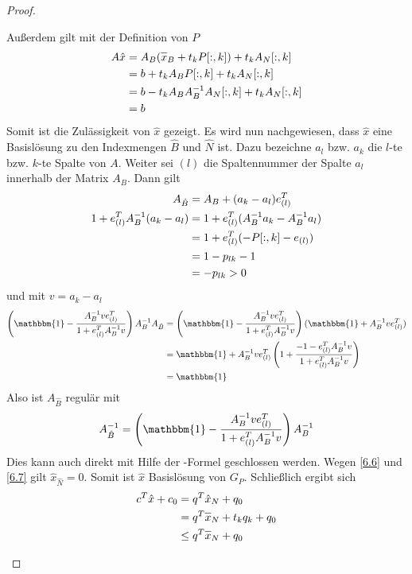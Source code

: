 \begin{proof}
\begin{enumerate}[label=(\alph*)]
		Außerdem gilt mit der Definition von $P$
		\begin{align}
			A\hat{x} &= A_B(\overline{x}_B + t_kP[:,k]) + t_kA_N[:,k] \notag \\
			&= b + t_kA_BP[:,k] + t_kA_N[:,k] \notag \\
			&= b-t_kA_BA_B^{-1}A_N[:,k] + t_kA_N[:,k] \notag \\
			&= b \notag
		\end{align}
		Somit ist die Zulässigkeit von $\hat{x}$ gezeigt. Es wird nun nachgewiesen, dass $\hat{x}$ eine Basislösung zu den Indexmengen $\hat{B}$ und $\hat{N}$ ist. Dazu bezeichne $a_l$ bzw. $a_k$ die $l$-te bzw. $k$-te Spalte von $A$. Weiter sei $(l)$ die Spaltennummer der Spalte $a_l$ innerhalb der Matrix $A_B$. Dann gilt
		\begin{align}
			A_{\hat{B}} &= A_B + (a_k-a_l)e_{(l)}^T \notag \\
			1 + e^T_{(l)}A_B^{-1}(a_k-a_l) &= 1+ e^T_{(l)}(A_B^{-1}a_k - A_B^{-1}a_l) \notag \\
			&= 1 + e^T_{(l)}(-P[:,k] - e_{(l)}) \notag \\
			&= 1 - p_{lk} - 1 \notag \\
			&= -p_{lk} > 0 \notag
		\end{align}
		und mit $v=a_k-a_l$
		\begin{align}
			\left( \mathbbm{1} - \frac{A_B^{-1}ve^T_{(l)}}{1 + e^T_{(l)}A_B^{-1}v}\right)A_B^{-1}A_{\hat{B}} &= \left( \mathbbm{1} - \frac{A_B^{-1}ve^T_{(l)}}{1 + e^T_{(l)}A_B^{-1}v}\right) (\mathbbm{1} + A_B^{-1}ve^T_{(l)}) \notag \\
			&= \mathbbm{1} + A_B^{-1}ve^T_{(l)} \left( 1 + \frac{-1 - e^T_{(l)}A_B^{-1}v}{1 + e^T_{(l)}A_B^{-1}v}\right) \notag \\
			&= \mathbbm{1} \notag
		\end{align}
		Also ist $A_{\hat{B}}$ regulär mit
		\begin{align}
			A_{\hat{B}}^{-1} = \left( \mathbbm{1} - \frac{A_B^{-1}ve^T_{(l)}}{1 + e^T_{(l)}A_B^{-1}v}\right)A_B^{-1} \notag
		\end{align}
		Dies kann auch direkt mit Hilfe der -Formel geschlossen werden. Wegen \cref{6.6} und \cref{6.7} gilt $\hat{x}_{\hat{N}}=0$. Somit ist $\hat{x}$ Basislösung von $G_P$. Schließlich ergibt sich
		\begin{align}
			c^T\hat{x}+c_0 &= q^T\hat{x}_N + q_0 \notag \\
			&= q^T\overline{x}_N + t_kq_k + q_0 \notag \\
			&\le q^T\overline{x}_N + q_0 \notag \\

\end{align}
\end{enumerate}
\end{proof}
